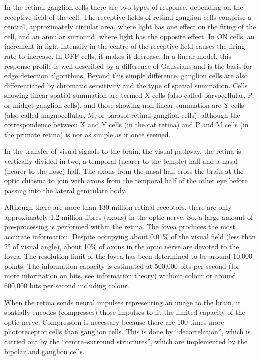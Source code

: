 In the retinal ganglion cells there are two types of response, depending on the receptive field of the cell. The receptive fields of retinal ganglion cells comprise a central, approximately circular area, where light has one effect on the firing of the cell, and an annular surround, where light has the opposite effect. In ON cells, an increment in light intensity in the centre of the receptive field causes the firing rate to increase. In OFF cells, it makes it decrease. In a linear model, this response profile is well described by a difference of Gaussians and is the basis for edge detection algorithms. Beyond this simple difference, ganglion cells are also differentiated by chromatic sensitivity and the type of spatial summation. Cells showing linear spatial summation are termed X cells (also called parvocellular, P, or midget ganglion cells), and those showing non-linear summation are Y cells (also called magnocellular, M, or parasol retinal ganglion cells), although the correspondence between X and Y cells (in the cat retina) and P and M cells (in the primate retina) is not as simple as it once seemed.

In the transfer of visual signals to the brain, the visual pathway, the retina is vertically divided in two, a temporal (nearer to the temple) half and a nasal (nearer to the nose) half. The axons from the nasal half cross the brain at the optic chiasma to join with axons from the temporal half of the other eye before passing into the lateral geniculate body.

Although there are more than 130 million retinal receptors, there are only approximately 1.2 million fibres (axons) in the optic nerve. So, a large amount of pre-processing is performed within the retina. The fovea produces the most accurate information. Despite occupying about 0.01\% of the visual field (less than 2° of visual angle), about 10\% of axons in the optic nerve are devoted to the fovea. The resolution limit of the fovea has been determined to be around 10,000 points. The information capacity is estimated at 500,000 bits per second (for more information on bits, see information theory) without colour or around 600,000 bits per second including colour.

When the retina sends neural impulses representing an image to the brain, it spatially encodes (compresses) those impulses to fit the limited capacity of the optic nerve. Compression is necessary because there are 100 times more photoreceptor cells than ganglion cells. This is done by ``decorrelation'', which is carried out by the ``centre--surround structures'', which are implemented by the bipolar and ganglion cells.

